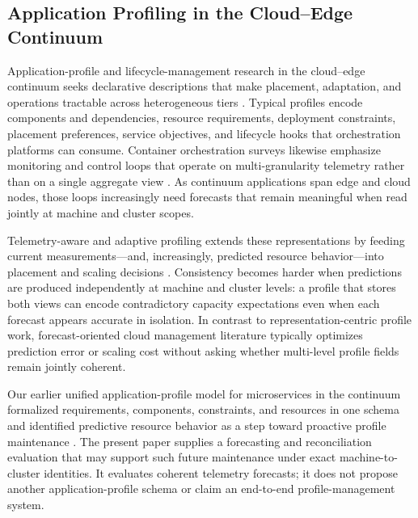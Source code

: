 \documentclass[a4paper,fleqn]{cas-dc}
\begin{document}
\subsection{Application Profiling in the Cloud--Edge Continuum}
Application-profile and lifecycle-management research in the cloud--edge
continuum seeks declarative descriptions that make placement, adaptation, and
operations tractable across heterogeneous tiers
\cite{duc2020survey,taherizadeh2018monitoring,buyya2019manifesto}.
Typical profiles encode components and dependencies, resource requirements,
deployment constraints, placement preferences, service objectives, and lifecycle
hooks that orchestration platforms can consume.
Container orchestration surveys likewise emphasize monitoring and control loops
that operate on multi-granularity telemetry rather than on a single aggregate
view
\cite{casalicchio2019container,rossi2020geo,toka2021kubernetes}.
As continuum applications span edge and cloud nodes, those loops increasingly
need forecasts that remain meaningful when read jointly at machine and cluster
scopes.

Telemetry-aware and adaptive profiling extends these representations by feeding
current measurements---and, increasingly, predicted resource behavior---into
placement and scaling decisions
\cite{taherizadeh2018monitoring,duc2020survey}.
Consistency becomes harder when predictions are produced independently at
machine and cluster levels: a profile that stores both views can encode
contradictory capacity expectations even when each forecast appears accurate in
isolation.
In contrast to representation-centric profile work, forecast-oriented cloud
management literature typically optimizes prediction error or scaling cost
without asking whether multi-level profile fields remain jointly coherent.

Our earlier unified application-profile model for microservices in the continuum
formalized requirements, components, constraints, and resources in one schema
and identified predictive resource behavior as a step toward proactive profile
maintenance
\cite{kadouma2025unifiedprofile}.
The present paper supplies a forecasting and reconciliation evaluation that may
support such future maintenance under exact machine-to-cluster identities.
It evaluates coherent telemetry forecasts; it does not propose another
application-profile schema or claim an end-to-end profile-management system.
\end{document}
